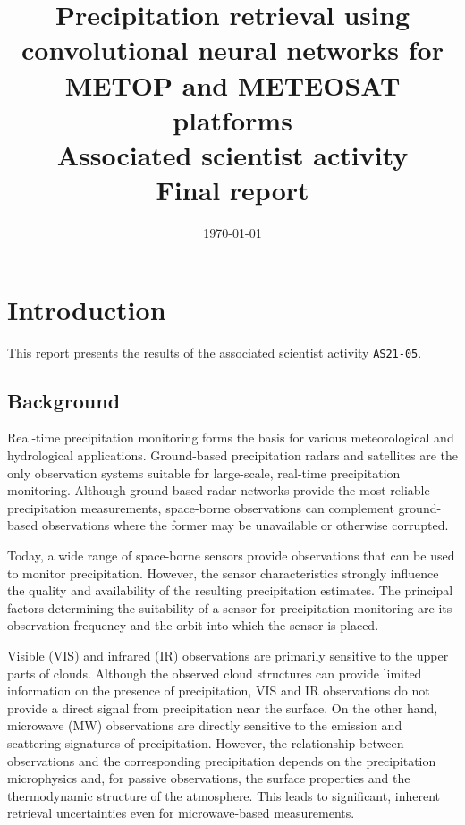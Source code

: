 \documentclass[11pt]{scrartcl}
\date{\today}
\title{Precipitation retrieval using convolutional neural networks for METOP and METEOSAT platforms\\\medskip
\large Associated scientist activity \\ Final report}
\begin{document}
\maketitle


\section{Introduction}
\label{sec:org8b2f08a}

This report presents the results of the associated scientist activity \texttt{AS21-05}. 


\subsection{Background}
\label{sec:orgc337a7d}


Real-time precipitation monitoring forms the basis for various meteorological
and hydrological applications. Ground-based precipitation radars and satellites
are the only observation systems suitable for large-scale, real-time
precipitation monitoring. Although ground-based radar networks provide the most
reliable precipitation measurements, space-borne observations can complement
ground-based observations where the former may be unavailable or otherwise
corrupted.


Today, a wide range of space-borne sensors provide observations that can be used
to monitor precipitation. However, the sensor characteristics strongly influence
the quality and availability of the resulting precipitation estimates. The
principal factors determining the suitability of a sensor for precipitation
monitoring are its observation frequency and the orbit into which the sensor is
placed.


Visible (VIS) and infrared (IR) observations are primarily sensitive to the
upper parts of clouds. Although the observed cloud structures can provide
limited information on the presence of precipitation, VIS and IR observations do not
provide a direct signal from precipitation near the surface. On the other
hand, microwave (MW) observations are directly sensitive to the emission and
scattering signatures of precipitation. However, the relationship between
observations and the corresponding precipitation depends on the precipitation
microphysics and, for passive observations, the surface properties and the
thermodynamic structure of the atmosphere. This leads to significant, inherent
retrieval uncertainties even for microwave-based measurements.
\end{document}
